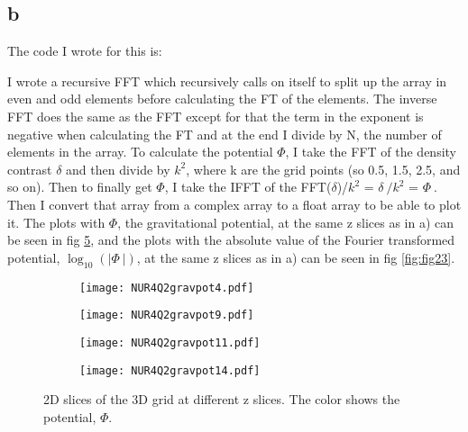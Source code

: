 \subsection*{b}

The code I wrote for this is:


I wrote a recursive FFT which recursively calls on itself to split up the array in even and odd elements before calculating the FT of the elements.
The inverse FFT does the same as the FFT except for that the term in the exponent is negative when calculating the FT and at the end I divide by N, the number of elements in the array. 
To calculate the potential $\Phi$, I take the FFT of the density contrast $\delta$ and then divide by $k^2$, where k are the grid points (so 0.5, 1.5, 2.5, and so on). 
Then to finally get $\Phi$, I take the IFFT of the FFT($\delta$)/$k^2$ = $\delta^{~}/k^2$ = $\Phi^{~}$. Then I convert that array from a complex array to a float array to be able to plot it.
The plots with $\Phi$, the gravitational potential, at the same z slices as in a) can be seen in fig \ref{fig:fig22}, and the plots with the absolute value of the Fourier transformed potential, $\log_{10}(|\Phi^{~}|)$, at the same z slices as in a) can be seen in fig \ref{fig:fig23}.

\begin{figure}[ht]
    \begin{subfigure}{.49\textwidth}
       \centering
    \texttt{[image: NUR4Q2gravpot4.pdf]}
    \centering
    \label{}
    \end{subfigure}
    \hfill
    \begin{subfigure}{.49\textwidth}
       \centering
    \texttt{[image: NUR4Q2gravpot9.pdf]}
    \centering
    \label{}
    \end{subfigure}
     \begin{subfigure}{.49\textwidth}
       \centering
    \texttt{[image: NUR4Q2gravpot11.pdf]}
    \centering
    \label{}
    \end{subfigure}
     \begin{subfigure}{.49\textwidth}
       \centering
    \texttt{[image: NUR4Q2gravpot14.pdf]}
    \centering
    \label{}
    \end{subfigure}
    \caption{2D slices of the 3D grid at different z slices. The color shows the potential, $\Phi$.}
    \label{fig:fig22}
\end{figure}

